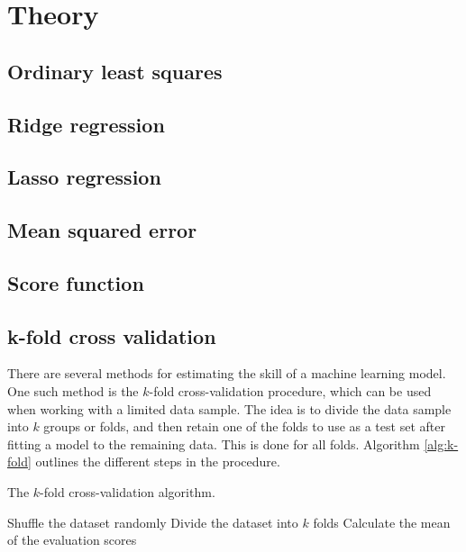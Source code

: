 \section{Theory}
\label{sec:theory}

\subsection{Ordinary least squares}

\subsection{Ridge regression}
	
\subsection{Lasso regression}

\subsection{Mean squared error}

\subsection{Score function}

\subsection{k-fold cross validation}
There are several methods for estimating the skill of a machine learning model. One such method is the $k$-fold cross-validation procedure, which can be used when working with a limited data sample. The idea is to divide the data sample into $k$ groups or folds, and then retain one of the folds to use as a test set after fitting a model to the remaining data. This is done for all folds. Algorithm \ref{alg:k-fold} outlines the different steps in the procedure. 

\begin{algorithm}[htbp]\caption{The $k$-fold cross-validation algorithm.}\label{alg:k-fold}
	\SetAlgoLined
	\BlankLine
	\BlankLine
	Shuffle the dataset randomly\;
	Divide the dataset into $k$ folds\;
	Calculate the mean of the evaluation scores\;	
	\BlankLine
	\BlankLine
\end{algorithm}

